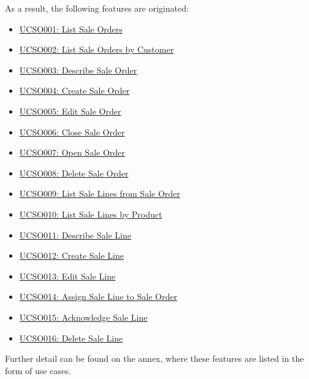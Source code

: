 As a result, the following features are originated:
\hfill\break
\begin{itemize}
\item \hyperref[UCSO001]{UCSO001: List Sale Orders}
\item \hyperref[UCSO002]{UCSO002: List Sale Orders by Customer}
\item \hyperref[UCSO003]{UCSO003: Describe Sale Order}
\item \hyperref[UCSO004]{UCSO004: Create Sale Order}
\item \hyperref[UCSO005]{UCSO005: Edit Sale Order}
\item \hyperref[UCSO006]{UCSO006: Close Sale Order}
\item \hyperref[UCSO007]{UCSO007: Open Sale Order}
\item \hyperref[UCSO008]{UCSO008: Delete Sale Order}
\item \hyperref[UCSO009]{UCSO009: List Sale Lines from Sale Order}
\item \hyperref[UCSO010]{UCSO010: List Sale Lines by Product}
\item \hyperref[UCSO011]{UCSO011: Describe Sale Line}
\item \hyperref[UCSO012]{UCSO012: Create Sale Line}
\item \hyperref[UCSO013]{UCSO013: Edit Sale Line}
\item \hyperref[UCSO014]{UCSO014: Assign Sale Line to Sale Order}
\item \hyperref[UCSO015]{UCSO015: Acknowledge Sale Line}
\item \hyperref[UCSO016]{UCSO016: Delete Sale Line}
\end{itemize}
\hfill\break
Further detail can be found on the annex, where these features are listed in the form of use cases.
